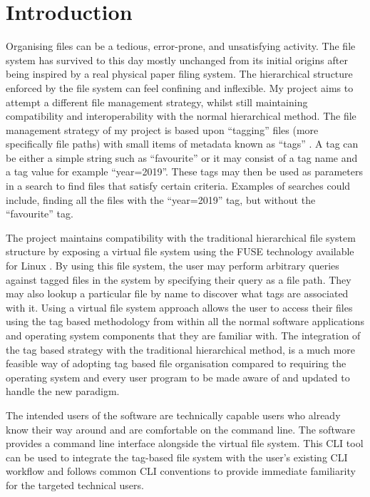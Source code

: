 \chapter{Introduction}
\vspace{1cm}

Organising files can be a tedious, error-prone, and unsatisfying activity. The
file system has survived to this day mostly unchanged from its initial origins
\cite{multics-fs} after being inspired by a real physical paper filing system.
The hierarchical structure enforced by the file system can feel confining and
inflexible. My project aims to attempt a different file management strategy,
whilst still maintaining compatibility and interoperability with the normal
hierarchical method. The file management strategy of my project is based upon
``tagging'' files (more specifically file paths) with small items of metadata
known as ``tags'' \cite{tags-exist}. A tag can be either a simple string such
as ``favourite'' or it may consist of a tag name and a tag value for example
``year=2019''. These tags may then be used as parameters in a search to find
files that satisfy certain criteria. Examples of searches could include,
finding all the files with the ``year=2019'' tag, but without the ``favourite''
tag.

The project maintains compatibility with the traditional hierarchical file
system structure by exposing a virtual file system using the FUSE technology
available for Linux \cite{kernel-fuse}. By using this file system, the user may
perform arbitrary queries against tagged files in the system by specifying
their query as a file path. They may also lookup a particular file by name to
discover what tags are associated with it. Using a virtual file system approach
allows the user to access their files using the tag based methodology from
within all the normal software applications and operating system components
that they are familiar with. The integration of the tag based strategy with the
traditional hierarchical method, is a much more feasible way of adopting tag
based file organisation compared to requiring the operating system and every
user program to be made aware of and updated to handle the new paradigm.

The intended users of the software are technically capable users who already
know their way around and are comfortable on the command line. The software
provides a command line interface alongside the virtual file system. This CLI
tool can be used to integrate the tag-based file system with the user's
existing CLI workflow and follows common CLI conventions to provide immediate
familiarity for the targeted technical users.

